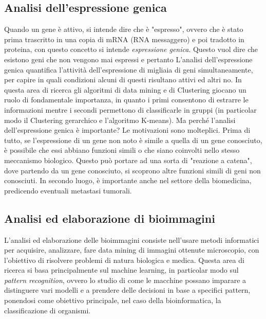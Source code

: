 \subsection{Analisi dell'espressione genica}
Quando un gene è attivo, si intende dire che è "espresso", ovvero che è stato prima trascritto in una copia di mRNA (RNA messaggero) e poi tradotto in proteina, con questo concetto si intende \textit{espressione genica}. Questo vuol dire che esistono geni che non vengono mai espressi e pertanto
\newline
L'analisi dell'espressione genica quantifica l'attività dell'espressione di migliaia di geni simultaneamente, per capire in quali condizioni alcuni di questi risultano attivi ed altri no.
\newline
In questa area di ricerca gli algoritmi di data mining e di Clustering giocano un ruolo di fondamentale importanza, in quanto i primi consentono di estrarre le informazioni mentre i secondi permettono di classificarle in gruppi (in particolar modo il Clustering gerarchico e l'algoritmo K-means).
\newline
Ma perché l'analisi dell'espressione genica è importante? Le motivazioni sono molteplici. Prima di tutto, se l'espressione di un gene non noto è simile a quella di un gene conosciuto, è possibile che essi abbiano funzioni simili o che siano coinvolti nello stesso meccanismo biologico. Questo può portare ad una sorta di "reazione a catena", dove partendo da un gene conosciuto, si scoprono altre funzioni simili di geni non conosciuti. In secondo luogo, è importante anche nel settore della biomedicina, predicendo eventuali metastasi tumorali.

\subsection{Analisi ed elaborazione di bioimmagini}
L'analisi ed elaborazione delle bioimmagini consiste nell'usare metodi informatici per acquisire, analizzare, fare data mining di immagini ottenute microscopio, con l'obiettivo di risolvere problemi di natura biologica e medica.
Questa area di ricerca si basa principalmente sul machine learning, in particolar modo sul \textit{pattern recognition}, ovvero lo studio di come le macchine possano imparare a distinguere vari modelli e a prendere delle decisioni in base a specifici pattern, ponendosi come obiettivo principale, nel caso della bioinformatica, la classificazione di organismi.

